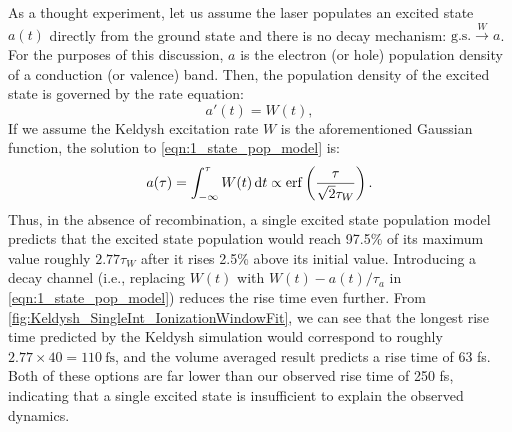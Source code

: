 As a thought experiment, let us assume the laser populates an excited state $a(t)$ directly from the ground state and there is no decay mechanism: $\textrm{g.s.} \xrightarrow{W} a$. For the purposes of this discussion, $a$ is the electron (or hole) population density of a conduction (or valence) band. Then, the population density of the excited state is governed by the rate equation:
\begin{equation}
\label{eqn:1_state_pop_model}
a'(t) = W(t),
\end{equation}
If we assume the Keldysh excitation rate $W$ is the aforementioned Gaussian function, the solution to \cref{eqn:1_state_pop_model} is:
\begin{equation}
a(\tau) = \int_{-\infty}^{\tau} W(t) \dd{t} \propto \erf\left(\frac{\tau}{\sqrt{2}\tau_W}\right).
\end{equation}
Thus, in the absence of recombination, a single excited state population model predicts that the excited state population would reach 97.5\% of its maximum value roughly $2.77\tau_W$ after it rises 2.5\% above its initial value. Introducing a decay channel (i.e., replacing $W(t)$ with ${W(t)-a(t)/\tau_a}$ in \cref{eqn:1_state_pop_model}) reduces the rise time even further. From \cref{fig:Keldysh_SingleInt_IonizationWindowFit}, we can see that the longest rise time predicted by the Keldysh simulation would correspond to roughly $2.77 \times 40 = 110 \ \textrm{fs}$, and the volume averaged result predicts a rise time of 63 fs. Both of these options are far lower than our observed rise time of 250 fs, indicating that a single excited state is insufficient to explain the observed dynamics.

